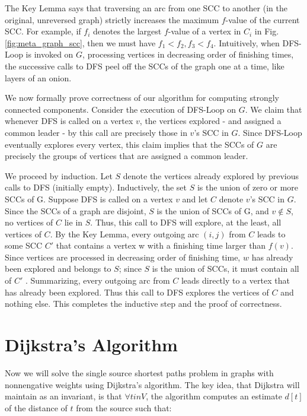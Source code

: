 \documentclass [12pt]{article}
\theoremstyle{definition}
\begin{document}
The Key Lemma says that traversing an arc from one SCC to another (in the original, unreversed graph) strictly increases the maximum $f$-value of the current SCC. For example, if $f_i$ denotes the largest $f$-value of a vertex in $C_i$ in Fig. \ref{fig:meta_graph_scc}, then we must have $f_1 < f_2, f_3 < f_4$. Intuitively, when DFS-Loop is invoked on $G$, processing vertices in decreasing order of finishing times, the successive calls to DFS peel off the SCCs of the graph one at a time, like layers of an onion. 

We now formally prove correctness of our algorithm for computing strongly connected components. Consider the execution of DFS-Loop on $G$. We claim that whenever DFS is called on a vertex $v$, the vertices explored - and assigned a common leader - by this call are precisely those in $v$'s SCC in $G$. Since DFS-Loop eventually explores every vertex, this claim implies that the SCCs of $G$ are precisely the groups of vertices that are assigned a common leader. 

We proceed by induction. Let $S$ denote the vertices already explored by previous calls to DFS (initially empty). Inductively, the set $S$ is the union of zero or more SCCs of G. Suppose DFS is called on a vertex $v$ and let $C$ denote $v$'s SCC in $G$. Since the SCCs of a graph are disjoint, $S$ is the union of SCCs of G, and $v \notin S$, no vertices of $C$ lie in $S$. Thus, this call to DFS will explore, at the least, all vertices of $C$. By the Key Lemma, every outgoing arc $(i, j)$ from $C$ leads to some SCC $C'$ that contains a vertex w with a finishing time larger than $f (v)$. Since vertices are processed in decreasing order of finishing time, $w$ has already been explored and belongs to $S$; since $S$ is the union of SCCs, it must contain all of $C'$ . Summarizing, every outgoing arc from $C$ leads directly to a vertex that has already been explored. Thus this call to DFS explores the vertices of $C$ and nothing else. This completes the inductive step and
the proof of correctness.


\section{Dijkstra's Algorithm}

Now we will solve the single source shortest paths problem in graphs with nonnengative
weights using Dijkstra's algorithm. The key idea, that Dijkstra will maintain as an invariant,
is that $\forall t in V$, the algorithm computes an estimate $d[t]$ of the distance of $t$ from the source such that:
\end{document}
